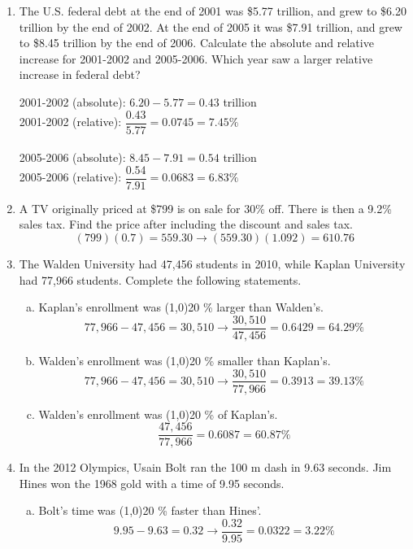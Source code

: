 \begin{enumerate}
\item The U.S. federal debt at the end of 2001 was \$5.77 trillion, and grew to \$6.20 trillion by the end of 2002. At the end of 2005 it was \$7.91 trillion, and grew to \$8.45 trillion by the end of 2006. Calculate the absolute and relative increase for 2001-2002 and 2005-2006. Which year saw a larger relative increase in federal debt? 
\begin{center}
2001-2002 (absolute): $6.20 - 5.77 = 0.43$ trillion\\
2001-2002 (relative): $\dfrac{0.43}{5.77} = 0.0745 = 7.45\%$\\ \text{}\\
2005-2006 (absolute): $8.45 - 7.91 = 0.54$ trillion\\
2005-2006 (relative): $\dfrac{0.54}{7.91} = 0.0683 = 6.83\%$
\end{center}

\item A TV originally priced at \$799 is on sale for 30\% off. There is then a 9.2\% sales tax. Find the price after including the discount and sales tax. 
\[(799)(0.7) = 559.30 \longrightarrow (559.30)(1.092) = 610.76\]

\item The Walden University had 47,456 students in 2010, while Kaplan University had 77,966 students.  Complete the following statements.
\begin{enumerate}[(a)]
\item Kaplan's enrollment was \line(1,0){20} \% larger than Walden's. 
\[77,966 - 47,456 = 30,510 \longrightarrow \dfrac{30,510}{47,456} = 0.6429 = 64.29\%\]

\item Walden's enrollment was \line(1,0){20} \% smaller than Kaplan's. 
\[77,966 - 47,456 = 30,510 \longrightarrow \dfrac{30,510}{77,966} = 0.3913 = 39.13\%\]

\item Walden's enrollment was \line(1,0){20} \% of Kaplan's. 
\[\dfrac{47,456}{77,966} = 0.6087 = 60.87\%\]
\end{enumerate}

\item In the 2012 Olympics, Usain Bolt ran the 100 m dash in 9.63 seconds.  Jim Hines won the 1968 gold with a time of 9.95 seconds.
\begin{enumerate}[(a)]
\item Bolt's time was \line(1,0){20} \% faster than Hines'. 
\[9.95 - 9.63 = 0.32 \longrightarrow \dfrac{0.32}{9.95} = 0.0322 = 3.22\%\]


\end{enumerate}
\end{enumerate}
